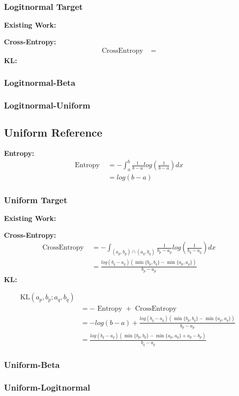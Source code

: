 \documentclass{article}
\begin{document}
\subsubsection{Logitnormal Target}

\noindent \textbf{Existing Work:}

\noindent \textbf{Cross-Entropy:}
$$ \begin{aligned} \text { CrossEntropy }&=
\end{aligned} $$
\noindent \textbf{KL:}


\subsubsection{Logitnormal-Beta}
\subsubsection{Logitnormal-Uniform}


\subsection{Uniform Reference}

\noindent \textbf{Entropy:}
$$ \begin{aligned} \text { Entropy }&=-\int_{a}^{b}\frac{1}{b-a}log(\frac{1}{b-a})dx\\&=log(b-a)
\end{aligned} $$

\subsubsection{Uniform Target}

\noindent \textbf{Existing Work:}

\noindent \textbf{Cross-Entropy:}
$$ \begin{aligned} \text { CrossEntropy }&=-\int_{(a_{p},b_{p}) \cap (a_{q},b_{q}) }\frac{1}{b_{p}-a_{p}}log(\frac{1}{b_{q}-a_{q}})dx \\&=\frac{log(b_{q}-a_{q})(\min \{b_{p},b_{q}\}-\min \{a_{p},a_{q}\})}{b_{p}-a_{p}}
\end{aligned} $$
\noindent \textbf{KL:}

$$ \begin{aligned}
\mathrm{KL}\left(a_{p}, b_{p} ; a_{q},b_{q}\right)\\&=-\text { Entropy }+\text { CrossEntropy }\\&=-log(b-a)+\frac{log(b_{q}-a_{q})(\min \{b_{p},b_{q}\}-\min \{a_{p},a_{q}\})}{b_{p}-a_{p}}\\&=\frac{log(b_{q}-a_{q})(\min \{b_{p},b_{q}\}-\min \{a_{p},a_{q}\}+a_{p}-b_{p})}{b_{q}-a_{q}}
\end{aligned} $$

\subsubsection{Uniform-Beta}
\subsubsection{Uniform-Logitnormal}
\end{document}
